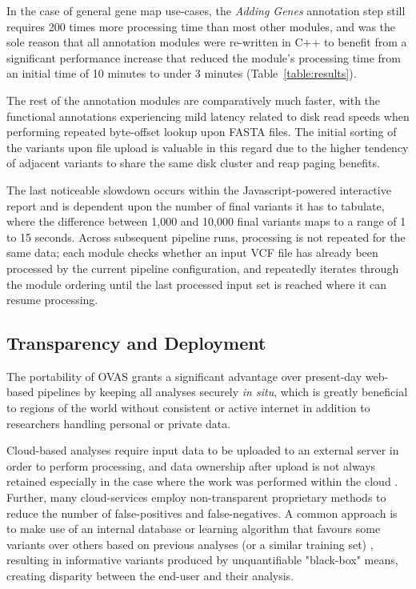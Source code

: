 \documentclass[twocolumn]{bmcart}%
\def\app{OVAS}
\begin{document}
In the case of general gene map use-cases, the \textit{Adding Genes} annotation step still requires 200 times more processing time than most other modules, and was the sole reason that all annotation modules were re-written in C++ to benefit from a significant performance increase that reduced the module's processing time from an initial time of 10 minutes to under 3 minutes (Table~\ref{table:results}). 

The rest of the annotation modules are comparatively much faster, with the functional annotations experiencing mild latency related to disk read speeds when performing repeated byte-offset lookup upon FASTA files. The initial sorting of the variants upon file upload is valuable in this regard due to the higher tendency of adjacent variants to share the same disk cluster and reap paging benefits.

The last noticeable slowdown occurs within the Javascript-powered interactive report and is dependent upon the number of final variants it has to tabulate, where the difference between 1,000 and 10,000 final variants maps to a range of 1 to 15 seconds. Across subsequent pipeline runs, processing is not repeated for the same data; each module checks whether an input VCF file has already been processed by the current pipeline configuration, and repeatedly iterates through the module ordering until the last processed input set is reached where it can resume processing.




\subsection{Transparency and Deployment}

The portability of \app{} grants a significant advantage over present-day web-based pipelines by keeping all analyses securely \textit{in situ}, which is greatly beneficial to regions of the world without consistent or active internet in addition to researchers handling personal or private data.

Cloud-based analyses require input data to be uploaded to an external server in order to perform processing, and data ownership after upload is not always retained especially in the case where the work was performed within the cloud \cite{reed2010information}. Further, many cloud-services employ non-transparent proprietary methods to reduce the number of false-positives and false-negatives. A common approach is to make use of an internal database or learning algorithm that favours some variants over others based on previous analyses (or a similar training set) \cite{pabinger2014survey}, resulting in informative variants produced by unquantifiable "black-box" means, creating disparity between the end-user and their analysis.
\end{document}
